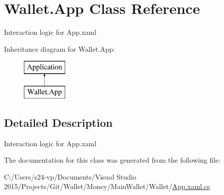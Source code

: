 \hypertarget{class_wallet_1_1_app}{}\section{Wallet.\+App Class Reference}
\label{class_wallet_1_1_app}


Interaction logic for App.\+xaml  


Inheritance diagram for Wallet.\+App\+:\begin{figure}[H]
\begin{center}
\leavevmode
\includegraphics[height=2.000000cm]{class_wallet_1_1_app}
\end{center}
\end{figure}


\subsection{Detailed Description}
Interaction logic for App.\+xaml 



The documentation for this class was generated from the following file\+:\begin{DoxyCompactItemize}
\item 
C\+:/\+Users/s24-\/vp/\+Documents/\+Visual Studio 2015/\+Projects/\+Git/\+Wallet/\+Money/\+Main\+Wallet/\+Wallet/\hyperlink{_app_8xaml_8cs}{App.\+xaml.\+cs}\end{DoxyCompactItemize}
